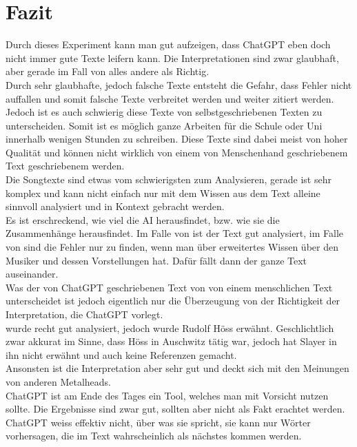 \documentclass[twocolumn,10pt]{article}
\begin{document}
	\section{Fazit}
	Durch dieses Experiment kann man gut aufzeigen, dass ChatGPT\cite{ChatGPT} eben doch nicht immer gute Texte leifern kann. Die Interpretationen sind zwar glaubhaft, aber gerade im Fall von  alles andere als Richtig.\\
	Durch sehr glaubhafte, jedoch falsche Texte entsteht die Gefahr, dass Fehler nicht auffallen und somit falsche Texte verbreitet werden und weiter zitiert werden.\\	
	Jedoch ist es auch schwierig diese Texte von selbstgeschriebenen Texten zu unterscheiden. Somit ist es möglich ganze Arbeiten für die Schule oder Uni innerhalb wenigen Stunden zu schreiben. Diese Texte sind dabei meist von hoher Qualität und können nicht wirklich von einem von Menschenhand geschriebenem Text geschriebenem werden.\\	
	Die Songtexte sind etwas vom schwierigsten zum Analysieren, gerade  ist sehr komplex und kann nicht einfach nur mit dem Wissen aus dem Text alleine sinnvoll analysiert und in Kontext gebracht werden.\\	
	Es ist erschreckend, wie viel die AI herausfindet, bzw. wie sie die Zusammenhänge herausfindet. Im Falle von  ist der Text gut analysiert, im Falle von  sind die Fehler nur zu finden, wenn man über erweitertes Wissen über den Musiker und dessen Vorstellungen hat. Dafür fällt dann der ganze Text auseinander.\\	
	Was der von ChatGPT geschriebenen Text von  von einem menschlichen Text unterscheidet ist jedoch eigentlich nur die Überzeugung von der Richtigkeit der Interpretation, die ChatGPT vorlegt.\\
	 wurde recht gut analysiert, jedoch wurde Rudolf Höss erwähnt. Geschlichtlich zwar akkurat im Sinne, dass Höss in Auschwitz tätig war, jedoch hat Slayer in  ihn nicht erwähnt und auch keine Referenzen gemacht.\\
	Ansonsten ist die Interpretation aber sehr gut und deckt sich mit den Meinungen von anderen Metalheads.\\
	\vfill
	\pagebreak
	ChatGPT ist am Ende des Tages ein Tool, welches man mit Vorsicht nutzen sollte. Die Ergebnisse sind zwar gut, sollten aber nicht als Fakt erachtet werden. ChatGPT weiss effektiv nicht, über was sie spricht, sie kann nur Wörter vorhersagen, die im Text wahrscheinlich als nächstes kommen werden.\\
\end{document}
